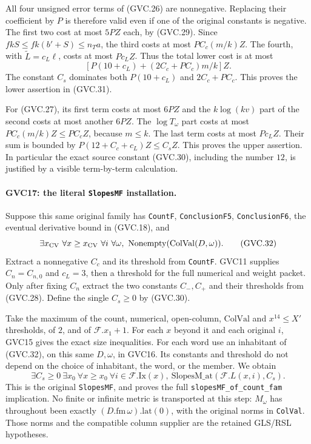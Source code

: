 All four unsigned error terms of (GVC.26) are nonnegative.
Replacing their coefficient by $P$ is therefore valid even if
one of the original constants is negative.
The first two cost at most $5PZ$ each, by (GVC.29).
Since $fkS\le fk(b'+S)\le n_Ta$,
the third costs at most $PC_c(m/k)Z$.
The fourth, with $\widetilde L=c_L\ell$, costs at most $Pc_LZ$.
Thus the total lower cost is at most
\[
 [P(10+c_L)+(2C_c+PC_c)m/k]Z .
\]
The constant $C_s$ dominates both $P(10+c_L)$ and
$2C_c+PC_c$. This proves the lower assertion in (GVC.31).

For (GVC.27), its first term costs at most $6PZ$ and
the $k\log(kv)$ part of the second costs at most another $6PZ$.
The $\log T_\omega$ part costs at most $PC_c(m/k)Z\le PC_cZ$,
because $m\le k$. The last term costs at most $Pc_LZ$.
Their sum is bounded by $P(12+C_c+c_L)Z\le C_sZ$.
This proves the upper assertion.
In particular the exact source constant (GVC.30), including
the number $12$, is justified by a visible term-by-term calculation.

\paragraph{GVC17: the literal \texttt{SlopesMF} installation.}
\label{claim:GVC17}
Suppose this same original family has
\texttt{CountF}, \texttt{ConclusionF5}, \texttt{ConclusionF6},
the eventual derivative bound in (GVC.18), and
\[
 \exists x_{\rm CV}\ \forall x\ge x_{\rm CV}\
       \forall i\ \forall\omega,\
              \mathrm{Nonempty}(\mathrm{ColVal}(D,\omega)).
                                                               \tag{GVC.32}
\]
Extract a nonnegative $C_c$ and its threshold from
\texttt{CountF}. GVC11 supplies $C_n=C_{n,0}$ and $c_L=3$,
then a threshold for the full numerical and weight packet.
Only after fixing $C_n$ extract the two constants $C_-,C_+$
and their thresholds from (GVC.28).
Define the single $C_s\ge0$ by (GVC.30).

Take the maximum of the count, numerical, open-column,
$\mathrm{ColVal}$ and $x^{14}\le X'$ thresholds, of $2$, and
of $\mathcal F.x_1+1$. For each $x$ beyond it and each original
$i$, GVC15 gives the exact size inequalities.
For each word use an inhabitant of (GVC.32), on this same
$D,\omega$, in GVC16. Its constants and threshold do not depend
on the choice of inhabitant, the word, or the member.
We obtain
\[
 \exists C_s\ge0\ \exists x_0\
   \forall x\ge x_0\ \forall i\in\mathcal F.\mathrm{Ix}(x),\
          \mathrm{SlopesM\_at}(\mathcal F.L(x,i),C_s).
                                                               \tag{GVC.33}
\]
This is the original \texttt{SlopesMF}, and proves the full
\texttt{slopesMF\_of\_count\_fam} implication.
No finite or infinite metric is transported at this step:
$M_\omega$ has throughout been exactly
$(D.\mathrm{fm}\,\omega).\mathrm{lat}(0)$, with the original
norms in \texttt{ColVal}. Those norms and the compatible
column supplier are the retained GLS/RSL hypotheses.


